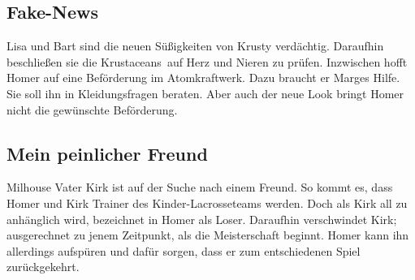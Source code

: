 
\subsection{Fake-News}\label{VABF21}
Lisa und Bart sind die neuen Süßigkeiten von Krusty verdächtig. Daraufhin beschließen sie die \glqq Krustaceans\grqq\ auf Herz und Nieren zu prüfen. Inzwischen hofft Homer auf eine Beförderung im Atomkraftwerk. Dazu braucht er Marges Hilfe. Sie soll ihn in Kleidungsfragen beraten. Aber auch der neue Look bringt Homer nicht die gewünschte Beförderung.


\subsection{Mein peinlicher Freund}\label{VABF22}
Milhouse Vater Kirk ist auf der Suche nach einem Freund. So kommt es, dass Homer und Kirk Trainer des Kinder-Lacrosseteams werden. Doch als Kirk all zu anhänglich wird, bezeichnet in Homer als Loser. Daraufhin verschwindet Kirk; ausgerechnet zu jenem Zeitpunkt, als die Meisterschaft beginnt. Homer kann ihn allerdings aufspüren und dafür sorgen, dass er zum entschiedenen Spiel zurückgekehrt.


